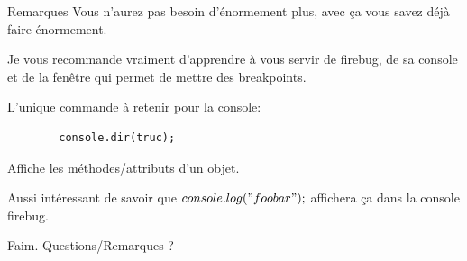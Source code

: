 \documentclass{beamer}
\begin{document}
\begin{frame}[fragile]{Remarques}
    Vous n'aurez pas besoin d'énormement plus, avec ça vous savez déjà faire énormement.

    \vspace{3mm}
    Je vous recommande vraiment d'apprendre à vous servir de firebug, de sa console et de la fenêtre qui permet de mettre des breakpoints.

    \vspace{3mm}
    L'unique commande à retenir pour la console:
    \begin{verbatim}
        console.dir(truc);
    \end{verbatim}
    Affiche les méthodes/attributs d'un objet.

    \vspace{3mm}
    Aussi intéressant de savoir que $console.log("foobar");$ affichera ça dans la console firebug.
\end{frame}

\begin{frame}[fragile]{}
\begin{LARGE}
\begin{center}
Faim. Questions/Remarques ?
\end{center}
\end{LARGE}
\end{frame}
\end{document}

